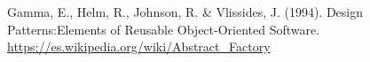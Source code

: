 \documentclass[a4paper,10pt]{article}
\begin{document}
\begin{enumerate}
\begin{enumerate}
        \end{enumerate}

        \begin{thebibliography}{2}
             Gamma, E., Helm, R., Johnson, R. & Vlissides, J. (1994). Design Patterns:Elements of Reusable Object-Oriented Software.        
             \url{https://es.wikipedia.org/wiki/Abstract_Factory}                 
          \end{thebibliography}
        
        
       
        
                 

\end{enumerate}
\end{document}
